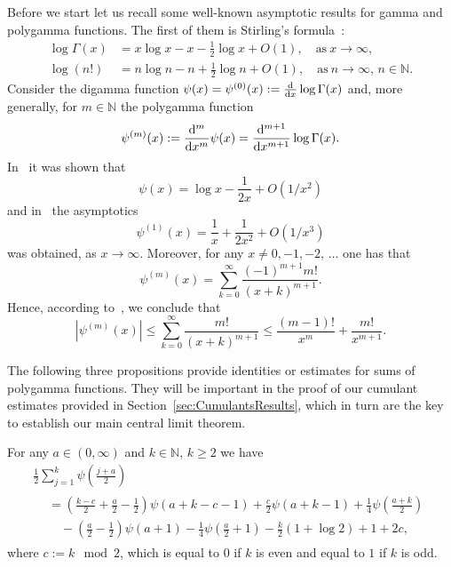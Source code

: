\documentclass[AHL,Unicode,longabstracts,published]{cedram}
\newcommand{\N}{\mathbb{N}}
\newcommand{\dd}{{\rm d}}
\begin{document}
Before we start let us recall some well-known asymptotic results for gamma and polygamma functions. The first of them is Stirling's formula~\cite[p.~140]{NIST}:
\begin{align}
\log\Gamma(x)&=x\log x-x-\frac12\log x+O(1),\quad \text{as}\ x\rightarrow\infty,\label{eq:AsympGamma}
\\
\log(n!)&=n\log n-n+\frac12 \log n+O(1),\quad\text{as}\ n\to\infty,\, n\in\mathbb{N}.\label{eq:Stirling}
\end{align}
Consider the digamma function $\psi(x)=\psi^{(0)}(x):=\frac{\dd}{\dd x}\log\Gamma(x)$ and, more generally, for $m\in\mathbb{N}$ the polygamma function
\[
\psi^{(m)}(x):=\frac{\dd^m}{\dd x^m}\psi(x)=\frac{\dd^{m+1}}{\dd x^{m+1}}\log\Gamma(x).
\]
In~\cite[Theorem~C]{QV04} it was shown that
\begin{equation}\label{eq:AsympDigamma}
\psi(x)=\log x-\frac{1}{2x}+O\left(1/x^{2}\right)
\end{equation}
and in~\cite{Mor10} the asymptotics
\begin{equation}\label{eq:AsympPolygamma}
\psi^{(1)}(x)=\frac{1}{x}+\frac{1}{2x^2}+O\left(1/x^{3}\right)
\end{equation}
was obtained, as $x\rightarrow\infty$. Moreover, for any $x\neq 0,-1,-2,\,\ldots$ one has that
\begin{equation}\label{eq:PolygammaSeriesFormula}
\psi^{(m)}(x)=\sum\limits_{k=0}^{\infty}\frac{(-1)^{m+1}m!}{(x+k)^{m+1}}.
\end{equation}
Hence, according to~\cite[p.~260]{AS64}, we conclude that
\begin{equation}\label{eq:PolygammaBound}
\left|\psi^{(m)}(x)\right|\leq \sum_{k=0}^{\infty}\frac{m!}{(x+k)^{m+1}}\leq\frac{(m-1)!}{x^m}+\frac{m!}{x^{m+1}}.
\end{equation}

The following three propositions provide identities or estimates for sums of polyg\-amma functions. They will be important in the proof of our cumulant estimates provided in Section~\ref{sec:CumulantsResults}, which in turn are the key to establish our main central limit theorem.

\begin{prop}\label{prop:DigammaSum}
For any $a\in(0,\infty)$ and $k\in\N$, $k\ge 2$ we have
\begin{multline*}
\frac12\sum\limits_{j=1}^k\psi\left(\frac{j+a}{2}\right)\\
\begin{aligned}
&=\left(\frac{k-c}{2}+\frac{a}{2}-\frac{1}{2}\right)\psi (a+k-c-1)+\frac{c}{2}\psi(a+k-1)+\frac{1}{4}\psi\left(\frac{a+k}{2}\right)\\
&\quad-\left(\frac{a}{2}-\frac{1}{2}\right)\psi(a+1)-\frac{1}{4}\psi\left(\frac{a}{2}+1\right)-\frac{k}{2}\left(1+\log 2\right) +1+2c,
\end{aligned}
\end{multline*}
where $c:= k\mod 2$, which is equal to $0$ if $k$ is even and equal to $1$ if $k$ is odd.
\end{prop}
\end{document}
